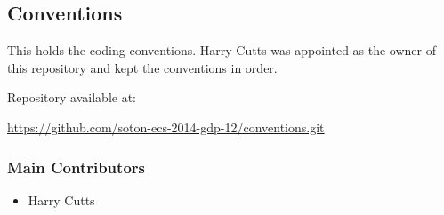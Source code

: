 \subsection{Conventions}
\label{Section:Repo_conventions}

This holds the coding conventions. Harry Cutts was appointed as the owner of this repository and kept the conventions in order.

Repository available at:

\url{https://github.com/soton-ecs-2014-gdp-12/conventions.git}

\subsubsection{Main Contributors}
\begin{itemize}
  \item Harry Cutts
\end{itemize}
